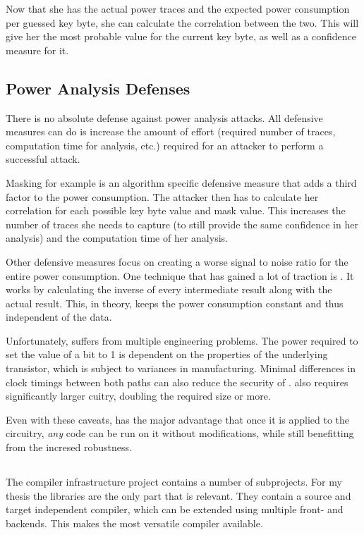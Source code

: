 Now that she has the actual power traces and the expected power consumption per guessed key byte, she can calculate the correlation between the two.
This will give her the most probable value for the current key byte, as well as a confidence measure for it.

\subsection{Power Analysis Defenses}
There is no absolute defense against power analysis attacks.
All defensive measures can do is increase the amount of effort (required number of traces, computation time for analysis, etc.) required for an attacker to perform a successful attack.

Masking for example is an algorithm specific defensive measure that adds a third factor to the power consumption.
The attacker then has to calculate her correlation for each possible key byte value and mask value.
This increases the number of traces she needs to capture (to still provide the same confidence in her analysis) and the computation time of her analysis.

Other defensive measures focus on creating a worse signal to noise ratio for the entire power consumption.
One technique that has gained a lot of traction is \dual{}\cite{sokolov2005design}.
It works by calculating the inverse of every intermediate result along with the actual result.
This, in theory, keeps the power consumption constant and thus independent of the data.

Unfortunately, \dual{} suffers from multiple engineering problems.
The power required to set the value of a bit to 1 is dependent on the properties of the underlying transistor, which is subject to variances in manufacturing.\cite{razafindraibe2006formal}
Minimal differences in clock timings between both paths can also reduce the security of \dual{}\cite{baddam2008path}.
\dual{} also requires significantly larger cuitry, doubling the required size or more\cite{baddam2008path}.

Even with these caveats, \dual{} has the major advantage that once it is applied to the circuitry, \emph{any} code can be run on it without modifications, while still benefitting from the incresed robustness.

\subsection{\llvm{}}
\label{llvm}
The \llvm{} compiler infrastructure project\cite{lattner2010llvm} contains a number of subprojects.
For my thesis the \lc{} libraries are the only part that is relevant.
They contain a source and target independent compiler, which can be extended using multiple front- and backends.
This makes \llvm{} the most versatile compiler available.

